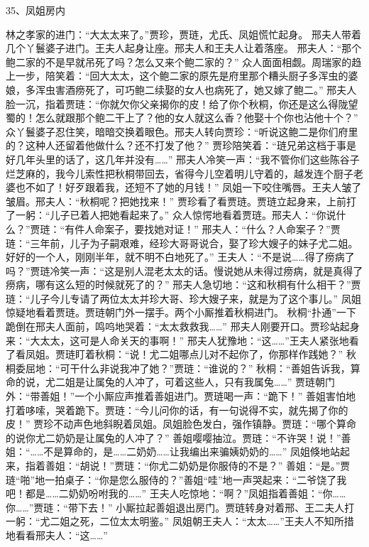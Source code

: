 35、凤姐房内\par
林之孝家的进门：“大太太来了。”贾珍，贾琏，尤氏、凤姐慌忙起身。
邢夫人带着几个丫鬟婆子进门。王夫人起身让座。邢夫人和王夫人让着落座。
邢夫人：“那个鲍二家的不是早就吊死了吗？怎么又来个鲍二家的？”
众人面面相觑。周瑞家的趋上一步，陪笑着：“回大太太，这个鲍二家的原先是府里那个糟头厨子多浑虫的婆娘，多浑虫害酒痨死了，可巧鲍二续娶的女人也病死了，她又嫁了鲍二。”
邢夫人脸一沉，指着贾琏：“你就欠你父亲揭你的皮！给了你个秋桐，你还是这么得陇望蜀的！怎么就跟那个鲍二干上了？他的女人就这么香？他娶十个你也沾他十个？”
众丫鬟婆子忍住笑，暗暗交换着眼色。邢夫人转向贾珍：“听说这鲍二是你们府里的？这种人还留着他做什么？还不打发了他？”
贾珍陪笑着：“琏兄弟这档于事是好几年头里的话了，这几年并没有……”
邢夫人冷笑一声：“我不管你们这些陈谷子烂芝麻的，我今儿索性把秋桐带回去，省得今儿空着明儿守着的，越发连个厨子老婆也不如了！好歹跟着我，还短不了她的月钱！”
凤姐一下咬住嘴唇。王夫人皱了皱眉。邢夫人：“秋桐呢？把她找来！”
贾珍看了看贾琏。贾琏立起身来，上前打了一躬：“儿子已着人把她看起来了。”
众人惊愕地看着贾琏。邢夫人：“你说什么？”贾琏：“有件人命案子，要找她对证！”
邢夫人：“什么？人命案子？”贾琏：“三年前，儿子为子嗣艰难，经珍大哥哥说合，娶了珍大嫂子的妹子尤二姐。好好的一个人，刚刚半年，就不明不白地死了。”
王夫人：“不是说……得了痨病了吗？”贾琏冷笑一声：“这是别人混老太太的话。慢说她从未得过痨病，就是真得了痨病，哪有这么短的时候就死了的？”
邢夫人急切地：“这和秋桐有什么相干？”贾琏：“儿子今儿专请了两位太太并珍大哥、珍大嫂子来，就是为了这个事儿。”
凤姐惊疑地看着贾琏。贾琏朝门外一摆手。两个小厮推着秋桐进门。
秋桐“扑通”一下跪倒在邢夫人面前，鸣呜地哭着：“太太救救我……”
邢夫人刚要开口。贾珍站起身来：“大太太，这可是人命关天的事啊！”
邢夫人犹豫地：“这……”王夫人紧张地看了看凤姐。贾琏盯着秋桐：“说！尤二姐哪点儿对不起你了，你那样作践她？”
秋桐委屈地：“可干什么非说我冲了她？”贾琏：“谁说的？”
秋桐：“善姐告诉我，算命的说，尤二姐是让属兔的人冲了，可着这些人，只有我属兔……”
贾琏朝门外：“带善姐！”一个小厮应声推着善姐进门。贾琏喝一声：“跪下！”
善姐害怕地打着哆嗦，哭着跪下。贾琏：“今儿问你的话，有一句说得不实，就先揭了你的皮！”
贾珍不动声色地斜睨着凤姐。凤姐脸色发白，强作镇静。贾琏：“哪个算命的说你尤二奶奶是让属兔的人冲了？”
善姐嘤嘤抽泣。贾琏：“不许哭！说！”善姐：“……不是算命的，是……二奶奶……让我编出来骗姨奶奶的……”
凤姐倏地站起来，指着善姐：“胡说！”贾琏：“你尤二奶奶是你服侍的不是？”
善姐：“是。”贾琏“啪”地一拍桌子：“你是您么服侍的？”善姐“哇”地一声哭起来：“二爷饶了我吧！都是……二奶奶吩咐我的……”
王夫人吃惊地：“啊？”凤姐指着善姐：“你……你……”贾琏：“带下去！”
小厮拉起善姐退出房门。贾琏转身对着邢、王二夫人打一躬：“尤二姐之死，二位太太明鉴。”
凤姐朝王夫人：“太太……”王夫人不知所措地看看邢夫人：“这……”
